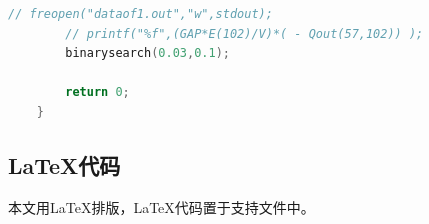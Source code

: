 \documentclass[12pt,AutoFakeBold]{article}%
\begin{document}
\begin{lstlisting}[language={c++}]
        // freopen("dataof1.out","w",stdout);
        // printf("%f",(GAP*E(102)/V)*( - Qout(57,102)) );
        binarysearch(0.03,0.1);
    
        return 0;
    }
    \end{lstlisting}
    \subsection{\LaTeX 代码}
    本文用\LaTeX 排版，\LaTeX 代码置于支持文件中。
\end{document}
